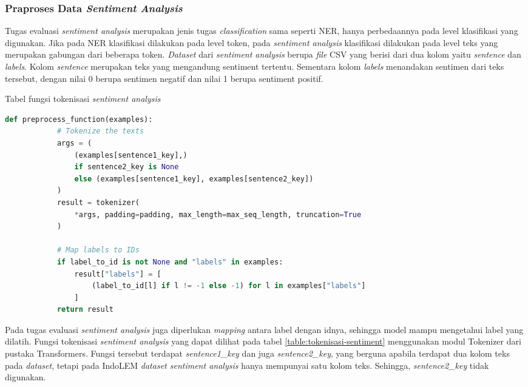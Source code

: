 \subsubsection{Praproses Data \textit{Sentiment Analysis}}

Tugas evaluasi \textit{sentiment analysis} merupakan jenis tugas \textit{classification} sama seperti NER, hanya perbedaannya pada level klasifikasi yang digunakan. Jika pada NER klasifikasi dilakukan pada level token, pada \textit{sentiment analysis} klasifikasi dilakukan pada level teks yang merupakan gabungan dari beberapa token. \textit{Dataset} dari \textit{sentiment analysis} berupa \textit{file} CSV yang berisi dari dua kolom yaitu \textit{sentence} dan \textit{labels}. Kolom \textit{sentence} merupakan teks yang mengandung sentiment tertentu. Sementara kolom \textit{labels} menandakan sentimen dari teks tersebut, dengan nilai 0 berupa sentimen negatif dan  nilai 1 berupa sentiment positif.

\begin{table}
    \caption{Tabel fungsi tokenisasi \textit{sentiment analysis}}
    \label{table:tokenisasi-sentiment}
    \begin{lstlisting}[language=python]
        def preprocess_function(examples):
            # Tokenize the texts
            args = (
                (examples[sentence1_key],)
                if sentence2_key is None
                else (examples[sentence1_key], examples[sentence2_key])
            )
            result = tokenizer(
                *args, padding=padding, max_length=max_seq_length, truncation=True
            )

            # Map labels to IDs
            if label_to_id is not None and "labels" in examples:
                result["labels"] = [
                    (label_to_id[l] if l != -1 else -1) for l in examples["labels"]
                ]
            return result
    \end{lstlisting}
\end{table}

Pada tugas evaluasi \textit{sentiment analysis} juga diperlukan \textit{mapping} antara label dengan idnya, sehingga model mampu mengetahui label yang dilatih. Fungsi tokenisasi \textit{sentiment analysis} yang dapat dilihat pada tabel \ref{table:tokenisasi-sentiment} menggunakan modul Tokenizer dari pustaka Transformers. Fungsi tersebut terdapat \textit{sentence1\_key} dan juga \textit{sentence2\_key}, yang berguna apabila terdapat dua kolom teks pada \textit{dataset}, tetapi pada IndoLEM \textit{dataset sentiment analysis} hanya mempunyai satu kolom teks. Sehingga, \textit{sentence2\_key} tidak digunakan. 


